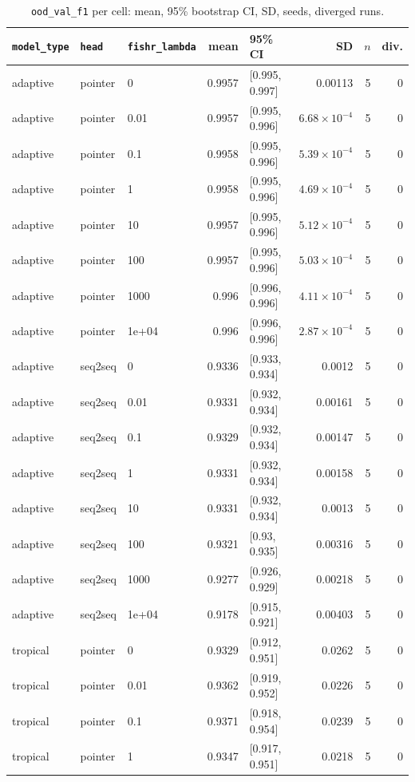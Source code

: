 \documentclass[10pt]{article}
\begin{document}
{\small
\begin{longtable}{lllrlrrr}
\caption{\texttt{ood\_val\_f1} per cell: mean, 95\% bootstrap CI, SD, seeds, diverged runs.}\label{tab:summary-ood_val_f1}\\
\toprule
\texttt{model\_type} & \texttt{head} & \texttt{fishr\_lambda} & mean & 95\% CI & SD & $n$ & div.\\
\midrule
\endhead
adaptive & pointer & 0 & 0.9957 & [0.995, 0.997] & 0.00113 & 5 & 0\\
adaptive & pointer & 0.01 & 0.9957 & [0.995, 0.996] & $6.68\times10^{-4}$ & 5 & 0\\
adaptive & pointer & 0.1 & 0.9958 & [0.995, 0.996] & $5.39\times10^{-4}$ & 5 & 0\\
adaptive & pointer & 1 & 0.9958 & [0.995, 0.996] & $4.69\times10^{-4}$ & 5 & 0\\
adaptive & pointer & 10 & 0.9957 & [0.995, 0.996] & $5.12\times10^{-4}$ & 5 & 0\\
adaptive & pointer & 100 & 0.9957 & [0.995, 0.996] & $5.03\times10^{-4}$ & 5 & 0\\
adaptive & pointer & 1000 & 0.996 & [0.996, 0.996] & $4.11\times10^{-4}$ & 5 & 0\\
adaptive & pointer & 1e+04 & 0.996 & [0.996, 0.996] & $2.87\times10^{-4}$ & 5 & 0\\
adaptive & seq2seq & 0 & 0.9336 & [0.933, 0.934] & 0.0012 & 5 & 0\\
adaptive & seq2seq & 0.01 & 0.9331 & [0.932, 0.934] & 0.00161 & 5 & 0\\
adaptive & seq2seq & 0.1 & 0.9329 & [0.932, 0.934] & 0.00147 & 5 & 0\\
adaptive & seq2seq & 1 & 0.9331 & [0.932, 0.934] & 0.00158 & 5 & 0\\
adaptive & seq2seq & 10 & 0.9331 & [0.932, 0.934] & 0.0013 & 5 & 0\\
adaptive & seq2seq & 100 & 0.9321 & [0.93, 0.935] & 0.00316 & 5 & 0\\
adaptive & seq2seq & 1000 & 0.9277 & [0.926, 0.929] & 0.00218 & 5 & 0\\
adaptive & seq2seq & 1e+04 & 0.9178 & [0.915, 0.921] & 0.00403 & 5 & 0\\
tropical & pointer & 0 & 0.9329 & [0.912, 0.951] & 0.0262 & 5 & 0\\
tropical & pointer & 0.01 & 0.9362 & [0.919, 0.952] & 0.0226 & 5 & 0\\
tropical & pointer & 0.1 & 0.9371 & [0.918, 0.954] & 0.0239 & 5 & 0\\
tropical & pointer & 1 & 0.9347 & [0.917, 0.951] & 0.0218 & 5 & 0\\

\end{longtable}}
\end{document}
